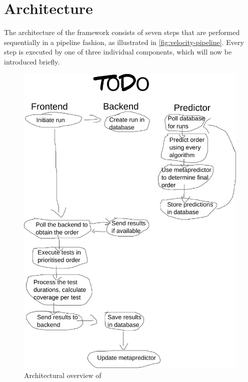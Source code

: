 
\section{Architecture}
The architecture of the \velocity{} framework consists of seven steps that are performed sequentially in a pipeline fashion, as illustrated in \autoref{fig:velocity-pipeline}. Every step is executed by one of three individual components, which will now be introduced briefly.

\begin{figure}[htbp!]
	\centering
	\includegraphics[width=\textwidth]{assets/images/pipeline.pdf}
	\caption{Architectural overview of \velocity{}}
	\label{fig:velocity-pipeline}
\end{figure}

